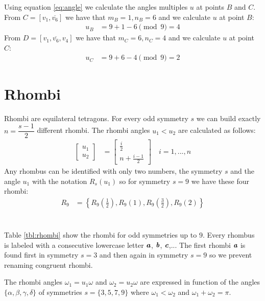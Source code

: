 \documentclass[11pt]{article}
\def\mathbi#1{\textbf{\em #1}}
\begin{document}
Using equation \ref{eq:angle} we calculate the angles multiples $u$ at points $B$ and $C$. From $C=[v_1,\overline{v_6}]$ we have that $m_B=1,n_B=6$ and we calculate $u$ at point $B$:
\begin{align}
u_B &= 9 + 1 - 6 \pmod{9} = 4
\end{align}
From $D = [v_1,\overline{v_6},v_4]$ we have that $m_C=6,n_C=4$ and we calculate $u$ at point $C$:
\begin{align}
u_C &= 9 + 6 - 4 \pmod{9} = 2
\end{align}

\section{Rhombi}

Rhombi are equilateral tetragons. For every odd symmetry $s$ we can build exactly $n = \dfrac{s-1}2$ different rhombi. The rhombi angles $u_1 < u_2$ are calculated as follows:
\begin{align}
\left[ \begin{array}{c} u_1 \\ u_2 \end{array} \right]
 &= \left[ \begin{array}{c} \frac{i}2 \\ n + \frac{i-1}2 \end{array} \right]
 \quad i = 1,...,n
\end{align}
Any rhombus can be identified with only two numbers, the symmetry $s$ and the angle $u_1$ with the notation $R_s(u_1)$ so for symmetry $s=9$ we have these four rhombi:
\begin{align}
R_9 &= \left\{ R_9\left(\frac{1}2\right), R_9(1), R_9\left(\frac{3}2\right), R_9(2) \right\}
\end{align}
\\\\
Table \ref{tbl:rhombi} show the rhombi for odd symmetries up to $9$. Every rhombus is labeled with a consecutive lowercase letter $\mathbi{a}$, $\mathbi{b}$, $\mathbi{c}$,... The first rhombi $\mathbi{a}$ is found first in symmetry $s=3$ and then again in symmetry $s=9$ so we prevent renaming congruent rhombi.

The rhombi angles $\omega_1 = u_1\omega$ and $\omega_2 = u_2\omega$ are expressed in function of the angles $\{\alpha,\beta,\gamma,\delta\}$ of symmetries $s=\{3,5,7,9\}$ where $\omega_1 < \omega_2$ and $\omega_1 + \omega_2 = \pi$.
\end{document}
